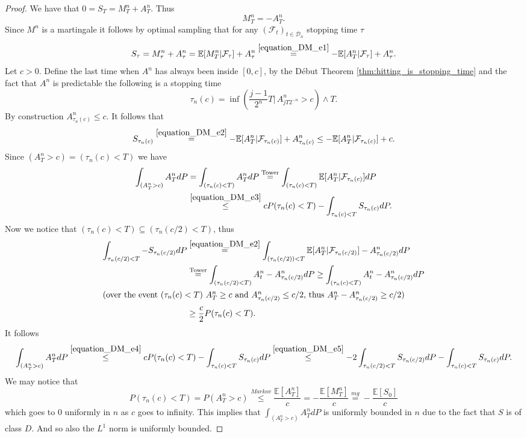 \begin{proof}
  We have that $0=S_T=M^n_T+A^n_T$. Thus
  \begin{equation}\label{equation_DM_e1}
  M^n_T=-A^n_T.
  \end{equation}
  Since $M^n$ is a martingale it follows by optimal sampling that for any $(\mathcal{F}_t)_{t\in\mathcal{D}_n}$ stopping time $\tau$
  \begin{equation}\label{equation_DM_e2}
  S_\tau=M^n_\tau+A^n_\tau = \mathbb{E}[M^n_T\vert\mathcal{F}_\tau]+A^n_\tau\stackrel{\eqref{equation_DM_e1}}{=} -\mathbb{E}[A^n_T\vert\mathcal{F}_\tau]+A^n_\tau.
  \end{equation}
  Let $c>0$. Define the last time when $A^n$ has always been inside $[0,c]$, by the Début Theorem \ref{thm:hitting_is_stopping_time} and the fact that $A^n$ is predictable the following is a stopping time
  $$
  \tau_n(c)=\inf\left(\frac{j-1}{2^n}T\vert\, A^n_{jT2^{-n}}>c\right)\wedge T.
  $$
  By construction $A^n_{\tau_n(c)}\leq c$. It follows that
  \begin{equation}\label{equation_DM_e3}
  S_{\tau_n(c)}\stackrel{\eqref{equation_DM_e2}}{=}-\mathbb{E}[A^n_T\vert\mathcal{F}_{\tau_n(c)}]+A^n_{\tau_n(c)}\leq -\mathbb{E}[A^n_T\vert\mathcal{F}_{\tau_n(c)}]+c.
  \end{equation}
  Since $(A^n_T>c)=(\tau_n(c)<T)$ we have
  \begin{align}\nonumber
  \int_{(A^n_T>c)}A^n_TdP&=\int_{(\tau_n(c)<T)}A^n_TdP\stackrel{\mathrm{Tower}}{=}\int_{(\tau_n(c)<T)}\mathbb{E}[A^n_T\vert\mathcal{F}_{\tau_n(c)}]dP\\
  &\stackrel{\eqref{equation_DM_e3}}{\leq} cP(\tau_n(c)<T)-\int_{\tau_n(c)<T}S_{\tau_n(c)}dP.\label{equation_DM_e4}
  \end{align}
  Now we notice that $(\tau_n(c)<T)\subseteq (\tau_n(c/2)<T)$, thus
  \begin{align}\nonumber
  \int_{\tau_n(c/2)<T}-S_{\tau_n(c/2)}dP&\stackrel{\eqref{equation_DM_e2}}{=}\int_{(\tau_n(c/2))<T}\mathbb{E}[A^n_T\vert\mathcal{F}_{\tau_n(c/2)}]-A^n_{\tau_n(c/2)}dP\\
  &\stackrel{\mathrm{Tower}}{=}\int_{(\tau_n(c/2)<T)}A^n_t-A^n_{\tau_n(c/2)}dP\geq \int_{(\tau_n(c)<T)}A^n_t-A^n_{\tau_n(c/2)}dP\nonumber\\
  \intertext{(over the event $(\tau_n(c)<T)$ $A^n_T\geq c$ and $A^n_{\tau_n(c/2)}\leq c/2$, thus $A^n_T-A^n_{\tau_n(c/2)}\geq c/2$)}
  &\geq \frac{c}{2}P(\tau_n(c)<T).\label{equation_DM_e5}
  \end{align}
  It follows
  $$
  \int_{(A^n_T>c)}A^n_TdP\stackrel{\eqref{equation_DM_e4}}{\leq}cP(\tau_n(c)<T)-\int_{\tau_n(c)<T}S_{\tau_n(c)}dP\stackrel{\eqref{equation_DM_e5}}{\leq}-2\int_{\tau_n(c/2)<T}S_{\tau_n(c/2)}dP-\int_{\tau_n(c)<T}S_{\tau_n(c)}dP.
  $$
  We may notice that
  $$
  P(\tau_n(c)<T)=P(A^n_T>c)\stackrel{Markov}{\leq}\frac{\mathbb{E}[A^n_T]}{c}=-\frac{\mathbb{E}[M^n_T]}{c}\stackrel{mg}{=}-\frac{\mathbb{E}[S_0]}{c}
  $$
  which goes to $0$ uniformly in $n$ as $c$ goes to infinity.
  This implies that $\int_{(A^n_T>c)}A^n_TdP$ is uniformly bounded in $n$ due to the fact that $S$ is of class $D$. And so also the $L^1$ norm is uniformly bounded.
\end{proof}

